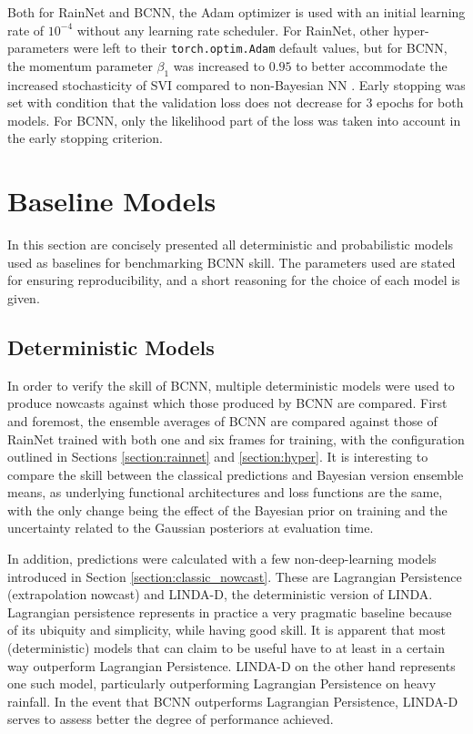  Both for RainNet and BCNN, the Adam optimizer is used with an initial learning rate of $10^{-4}$ without any learning rate scheduler. For RainNet, other hyper-parameters were left to their \texttt{torch.optim.Adam} default values, but for BCNN, the momentum parameter $\beta_1$ was increased to $0.95$ to better accommodate the increased stochasticity of SVI compared to non-Bayesian NN \cite{noauthor_svi_nodate}. Early stopping was set with condition that the validation loss does not decrease for 3 epochs for both models. For BCNN, only the likelihood part of the loss was taken into account in the early stopping criterion. 


\section{Baseline Models}

In this section are concisely presented all deterministic and probabilistic models used as baselines for benchmarking BCNN skill. The parameters used are stated for ensuring reproducibility, and a short reasoning for the choice of each model is given.

\subsection{Deterministic Models}
\label{section:det_model}

In order to verify the skill of BCNN, multiple deterministic models were used to produce nowcasts against which those produced by BCNN are compared. First and foremost, the ensemble averages of BCNN are compared against those of RainNet trained with both one and six frames for training, with the configuration outlined in Sections \ref{section:rainnet} and \ref{section:hyper}. It is interesting to compare the skill between the classical predictions and Bayesian version ensemble means, as underlying functional architectures and loss functions are the same, with the only change being the effect of the Bayesian prior on training and the uncertainty related to the Gaussian posteriors at evaluation time. 

In addition, predictions were calculated with a few non-deep-learning models introduced in Section \ref{section:classic_nowcast}. These are Lagrangian Persistence (extrapolation nowcast) and LINDA-D, the deterministic version of LINDA. Lagrangian persistence represents in practice 
a very pragmatic baseline because of its ubiquity and simplicity, while having good skill. It is apparent that most (deterministic) models that can claim to be useful have to at least in a certain way outperform Lagrangian Persistence. LINDA-D on the other hand represents one such model, particularly outperforming Lagrangian Persistence on heavy rainfall. In the event that BCNN outperforms Lagrangian Persistence, LINDA-D serves to assess better the degree of performance achieved. 


